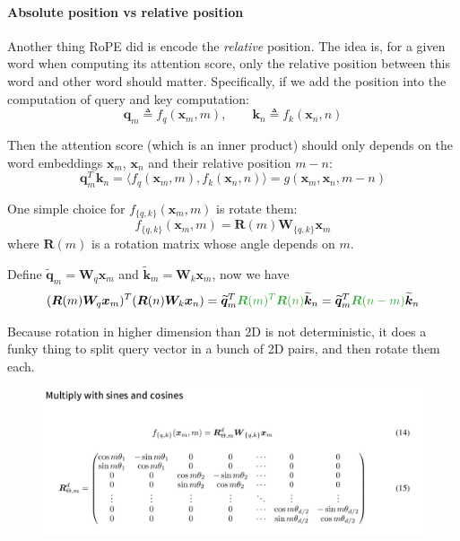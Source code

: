 \documentclass{article}
\begin{document}
\paragraph{Absolute position vs relative position}

Another thing RoPE did is encode the \textit{relative} position. 
The idea is, for a given word when computing its attention score, only the relative position between this word and other word should matter.
Specifically, if we add the position into the computation of query and key computation:
\[
\boldsymbol{q}_m \triangleq f_q(\boldsymbol{x}_m, m), \qquad  \boldsymbol{k}_n \triangleq f_k(\boldsymbol{x}_n, n)
\]

Then the attention score (which is an inner product) should only depends on the word embeddings $\boldsymbol{x}_m$, $\boldsymbol{x}_n$ and their relative position $m-n$:
\[
\boldsymbol{q}_m^{T} \boldsymbol{k}_n = \langle f_q(\boldsymbol{x}_m, m), f_k(\boldsymbol{x}_n, n) \rangle = g(\boldsymbol{x}_m, \boldsymbol{x}_n, m-n)
\]

One simple choice for $f_{\{q, k\}}(\boldsymbol{x}_m, m)$ is rotate them:
\[
f_{\{q, k\}}(\boldsymbol{x}_m, m) = \boldsymbol{R}(m) \boldsymbol{W}_{\{q, k\}} \boldsymbol{x}_m
\]
where $\boldsymbol{R}(m)$ is a rotation matrix whose angle depends on $m$.

Define $\widetilde{\boldsymbol{q}}_m =\boldsymbol{W}_q \boldsymbol{x}_m$ and $\widetilde{\boldsymbol{k}}_m =\boldsymbol{W}_k \boldsymbol{x}_m$, now we have
\[
(\boldsymbol{R}(m) \boldsymbol{W}_q \boldsymbol{x}_m)^{T} (\boldsymbol{R}(n) \boldsymbol{W}_k \boldsymbol{x}_n) = \widetilde{\boldsymbol{q}}_m^T \textcolor{mygreen}{\boldsymbol{R}(m)^T \boldsymbol{R}(n)} \widetilde{\boldsymbol{k}}_n = \widetilde{\boldsymbol{q}}_m^T \textcolor{mygreen}{\boldsymbol{R}(n-m)} \widetilde{\boldsymbol{k}}_n 
\]

Because rotation in higher dimension than 2D is not deterministic, it does a funky thing to split query vector in a bunch of 2D pairs, and then rotate them each.


\begin{figure}[!h]
	\centering
	\includegraphics[scale=0.4]{imgs/rope.png}
\end{figure}
\end{document}
